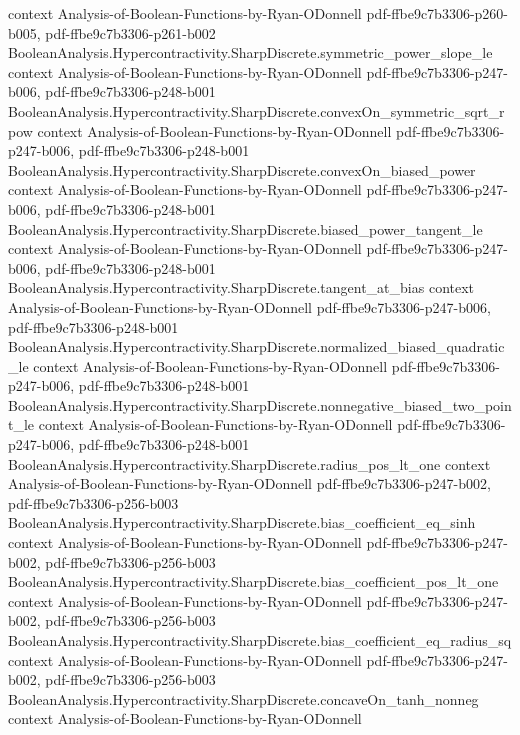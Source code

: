 \begin{theorem}
  {context}
  {Analysis-of-Boolean-Functions-by-Ryan-ODonnell}
  {pdf-ffbe9c7b3306-p260-b005,
    pdf-ffbe9c7b3306-p261-b002}
\proofstep
  {BooleanAnalysis.Hypercontractivity.SharpDiscrete.symmetric_power_slope_le}
  {context}
  {Analysis-of-Boolean-Functions-by-Ryan-ODonnell}
  {pdf-ffbe9c7b3306-p247-b006,
    pdf-ffbe9c7b3306-p248-b001}
\proofstep
  {BooleanAnalysis.Hypercontractivity.SharpDiscrete.convexOn_symmetric_sqrt_rpow}
  {context}
  {Analysis-of-Boolean-Functions-by-Ryan-ODonnell}
  {pdf-ffbe9c7b3306-p247-b006,
    pdf-ffbe9c7b3306-p248-b001}
\proofstep
  {BooleanAnalysis.Hypercontractivity.SharpDiscrete.convexOn_biased_power}
  {context}
  {Analysis-of-Boolean-Functions-by-Ryan-ODonnell}
  {pdf-ffbe9c7b3306-p247-b006,
    pdf-ffbe9c7b3306-p248-b001}
\proofstep
  {BooleanAnalysis.Hypercontractivity.SharpDiscrete.biased_power_tangent_le}
  {context}
  {Analysis-of-Boolean-Functions-by-Ryan-ODonnell}
  {pdf-ffbe9c7b3306-p247-b006,
    pdf-ffbe9c7b3306-p248-b001}
\proofstep
  {BooleanAnalysis.Hypercontractivity.SharpDiscrete.tangent_at_bias}
  {context}
  {Analysis-of-Boolean-Functions-by-Ryan-ODonnell}
  {pdf-ffbe9c7b3306-p247-b006,
    pdf-ffbe9c7b3306-p248-b001}
\proofstep
  {BooleanAnalysis.Hypercontractivity.SharpDiscrete.normalized_biased_quadratic_le}
  {context}
  {Analysis-of-Boolean-Functions-by-Ryan-ODonnell}
  {pdf-ffbe9c7b3306-p247-b006,
    pdf-ffbe9c7b3306-p248-b001}
\proofstep
  {BooleanAnalysis.Hypercontractivity.SharpDiscrete.nonnegative_biased_two_point_le}
  {context}
  {Analysis-of-Boolean-Functions-by-Ryan-ODonnell}
  {pdf-ffbe9c7b3306-p247-b006,
    pdf-ffbe9c7b3306-p248-b001}
\proofstep
  {BooleanAnalysis.Hypercontractivity.SharpDiscrete.radius_pos_lt_one}
  {context}
  {Analysis-of-Boolean-Functions-by-Ryan-ODonnell}
  {pdf-ffbe9c7b3306-p247-b002,
    pdf-ffbe9c7b3306-p256-b003}
\proofstep
  {BooleanAnalysis.Hypercontractivity.SharpDiscrete.bias_coefficient_eq_sinh}
  {context}
  {Analysis-of-Boolean-Functions-by-Ryan-ODonnell}
  {pdf-ffbe9c7b3306-p247-b002,
    pdf-ffbe9c7b3306-p256-b003}
\proofstep
  {BooleanAnalysis.Hypercontractivity.SharpDiscrete.bias_coefficient_pos_lt_one}
  {context}
  {Analysis-of-Boolean-Functions-by-Ryan-ODonnell}
  {pdf-ffbe9c7b3306-p247-b002,
    pdf-ffbe9c7b3306-p256-b003}
\proofstep
  {BooleanAnalysis.Hypercontractivity.SharpDiscrete.bias_coefficient_eq_radius_sq}
  {context}
  {Analysis-of-Boolean-Functions-by-Ryan-ODonnell}
  {pdf-ffbe9c7b3306-p247-b002,
    pdf-ffbe9c7b3306-p256-b003}
\proofstep
  {BooleanAnalysis.Hypercontractivity.SharpDiscrete.concaveOn_tanh_nonneg}
  {context}
  {Analysis-of-Boolean-Functions-by-Ryan-ODonnell}

\end{theorem}
